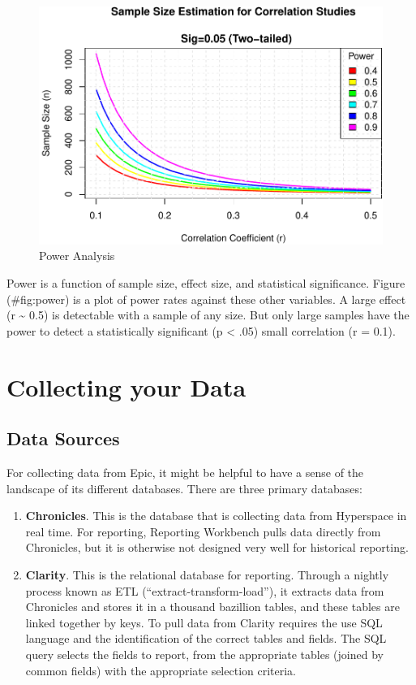 \documentclass[
]{report}
\begin{document}
\begin{figure}
\centering
\includegraphics{index_files/figure-latex/power-1.pdf}
\caption{Power Analysis}
\end{figure}

Power is a function of sample size, effect size, and statistical
significance. Figure (\#fig:power) is a plot of power rates against
these other variables. A large effect (r \textasciitilde{} 0.5) is
detectable with a sample of any size. But only large samples have the
power to detect a statistically significant (p \textless{} .05) small
correlation (r = 0.1).

\hypertarget{collecting-your-data}{%
\chapter{Collecting your Data}\label{collecting-your-data}}

\hypertarget{data-sources}{%
\section{Data Sources}\label{data-sources}}

For collecting data from Epic, it might be helpful to have a sense of
the landscape of its different databases. There are three primary
databases:

\begin{enumerate}
\def\labelenumi{\arabic{enumi}.}
\item
  \textbf{Chronicles}. This is the database that is collecting data from
  Hyperspace in real time. For reporting, Reporting Workbench pulls data
  directly from Chronicles, but it is otherwise not designed very well
  for historical reporting.
\item
  \textbf{Clarity}. This is the relational database for reporting.
  Through a nightly process known as ETL (``extract-transform-load''),
  it extracts data from Chronicles and stores it in a thousand bazillion
  tables, and these tables are linked together by keys. To pull data
  from Clarity requires the use SQL language and the identification of
  the correct tables and fields. The SQL query selects the fields to
  report, from the appropriate tables (joined by common fields) with the
  appropriate selection criteria.
\end{enumerate}
\end{document}
